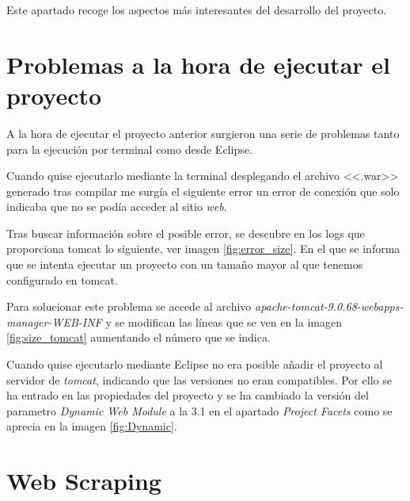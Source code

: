 
Este apartado recoge los aspectos más interesantes del desarrollo del proyecto.

\section{Problemas a la hora de ejecutar el proyecto}

A la hora de ejecutar el proyecto anterior surgieron una serie de problemas tanto para la ejecución por terminal como desde Eclipse.

Cuando quise ejecutarlo mediante la terminal desplegando el archivo <<.war>> generado tras compilar me surgía el siguiente error un error de conexión que solo indicaba que no se podía acceder al sitio \emph{web}.

Tras buscar información sobre el posible error, se descubre en los logs que proporciona tomcat lo siguiente, ver imagen \ref{fig:error_size}. En el que se informa que se intenta ejecutar un proyecto con un tamaño mayor al que tenemos configurado en tomcat.


Para solucionar este problema se accede al archivo \emph{apache-tomcat-9.0.68-webapps-manager-WEB-INF} y se modifican las líneas que se ven en la imagen \ref{fig:size_tomcat} aumentando el número que se indica.


Cuando quise ejecutarlo mediante Eclipse no era posible añadir el proyecto al servidor de \emph{tomcat}, indicando que las versiones no eran compatibles. Por ello se ha entrado en las propiedades del proyecto y se ha cambiado la versión del parametro \emph{Dynamic Web Module} a la 3.1 en el apartado \emph{Project Facets} como se aprecia en la imagen \ref{fig:Dynamic}.


\section{Web Scraping}

